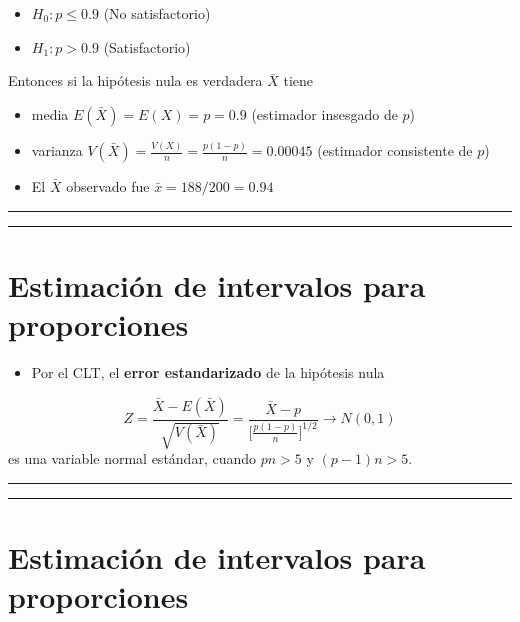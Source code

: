 \documentclass[
]{book}
\providecommand{\tightlist}{%
  \setlength{\itemsep}{0pt}\setlength{\parskip}{0pt}}
\begin{document}
\begin{itemize}
\tightlist
\item
  \(H_0: p \leq 0.9\) (No satisfactorio)
\item
  \(H_1: p> 0.9\) (Satisfactorio)
\end{itemize}

Entonces si la hipótesis nula es verdadera \(\bar{X}\) tiene

\begin{itemize}
\item
  media \(E(\bar{X})=E(X)=p=0.9\) (estimador insesgado de \(p\))
\item
  varianza \(V(\bar{X})=\frac{V(X)}{n}=\frac{p(1-p)}{n}=0.00045\) (estimador consistente de \(p\))
\item
  El \(\bar{X}\) observado fue \(\bar{x}=188/200=0.94\)
\end{itemize}

\begin{center}\rule{0.5\linewidth}{0.5pt}\end{center}

\begin{center}\rule{0.5\linewidth}{0.5pt}\end{center}

\hypertarget{estimaciuxf3n-de-intervalos-para-proporciones-1}{%
\section{Estimación de intervalos para proporciones}\label{estimaciuxf3n-de-intervalos-para-proporciones-1}}

\begin{itemize}
\tightlist
\item
  Por el CLT, el \textbf{error estandarizado} de la hipótesis nula
\end{itemize}

\[Z=\frac{\bar{X}-E(\bar{X})}{\sqrt{V(\bar{X})}}= \frac{\bar{X}-p}{\big[\frac{p(1-p)}{n} \big]^{1/2}}\rightarrow N(0,1)\]
es una variable normal estándar, cuando \(pn>5\) y \((p-1)n>5\).

\begin{center}\rule{0.5\linewidth}{0.5pt}\end{center}

\begin{center}\rule{0.5\linewidth}{0.5pt}\end{center}

\hypertarget{estimaciuxf3n-de-intervalos-para-proporciones-2}{%
\section{Estimación de intervalos para proporciones}\label{estimaciuxf3n-de-intervalos-para-proporciones-2}}
\end{document}
